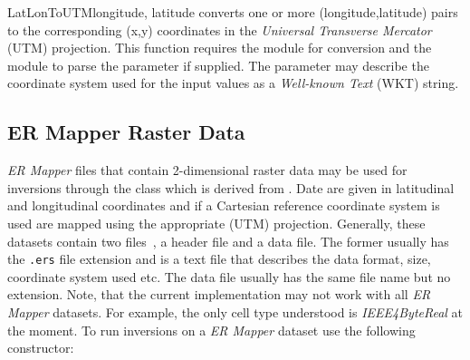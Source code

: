 \begin{funcdesc}{LatLonToUTM}{longitude, latitude%
}
converts one or more (longitude,latitude) pairs to the corresponding (x,y)
coordinates in the \emph{Universal Transverse Mercator} (UTM) projection.
This function requires the  module for conversion and the
 module to parse the  parameter if supplied.
The  parameter may describe the coordinate system used
for the input values as a \emph{Well-known Text} (WKT) string.
\end{funcdesc}

\subsection{ER Mapper Raster Data}\label{sec:ref:DataSource:ERM}
\emph{ER Mapper} files that contain 2-dimensional raster data may be used for
inversions through the  class which is derived from
. Date are given in latitudinal and longitudinal coordinates and if
a Cartesian reference coordinate system is used are mapped using the appropriate  (UTM) projection. 
Generally, these datasets contain two files~\cite{ERMAPPER}, a header file and a data file.
The former usually has the \texttt{.ers} file extension and is a text file that
describes the data format, size, coordinate system used etc.
The data file usually has the same file name but no extension.
Note, that the current implementation may not work with all \emph{ER Mapper}
datasets. For example, the only cell type understood is \emph{IEEE4ByteReal}
at the moment.
To run inversions on a \emph{ER Mapper} dataset use the following constructor:
